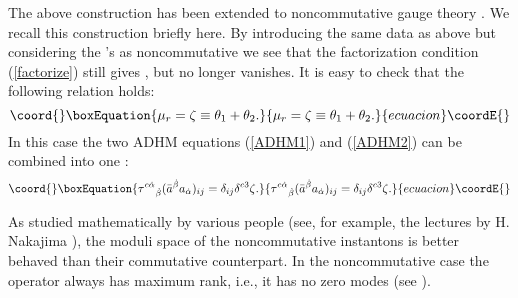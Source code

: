 \documentclass[a4paper,a4paper]{article}
\begin{document}
The above construction has been extended to noncommutative gauge
theory \cite{Schwarz}. We recall this construction briefly here.
By introducing the same data as above but considering  the \coordHE{}'s
as noncommutative we see that the factorization condition
(\ref{factorize}) still gives \coordHE{}, but \coordHE{} no longer
vanishes. It is easy to check that the following relation holds:
\begin{equation}\coord{}\boxEquation{ \mu_r=\zeta\equiv\theta_1+\theta_2.
}{ \mu_r=\zeta\equiv\theta_1+\theta_2.
}{ecuacion}\coordE{}\end{equation}
In this case the two ADHM equations (\ref{ADHM1}) and
(\ref{ADHM2}) can be combined into one \cite{Paperd}:
\begin{equation}\coord{}\boxEquation{
\label{ADHM} \tau^{c\dot\alpha}{}_{\dot\beta}(\bar a^{\dot\beta}
a_{\dot\alpha})_{ij}=\delta_{ij}\delta^{c3}\zeta.
}{
\tau^{c\dot\alpha}{}_{\dot\beta}(\bar a^{\dot\beta}
a_{\dot\alpha})_{ij}=\delta_{ij}\delta^{c3}\zeta.
}{ecuacion}\coordE{}\end{equation}

As studied mathematically by various people (see, for example, the
lectures by H. Nakajima \cite{Nakajima}), the moduli space of the
noncommutative instantons is better behaved than their commutative
counterpart. In the noncommutative case the operator
\myHighlight{$\Delta^\dagger\Delta$}\coordHE{} always has maximum rank, i.e., it has no
zero modes (see \cite{Reviewa}).
\end{document}
